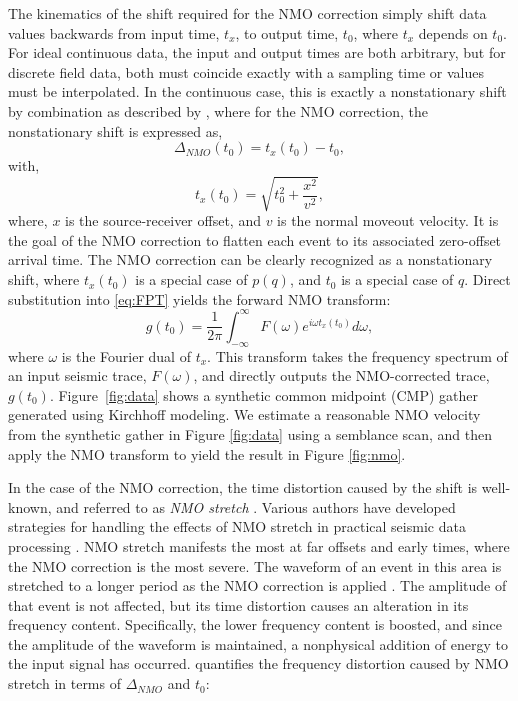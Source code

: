 The kinematics of the shift required for the NMO correction simply shift data values backwards from input time, $t_{x}$, to output time, $t_{0}$, where $t_{x}$ depends on $t_{0}$.  For ideal continuous data, the input and output times are both arbitrary, but for discrete field data, both must coincide exactly with a sampling time or values must be interpolated.  
In the continuous case, this is exactly a nonstationary shift by combination as described by \cite{margrave98}, where for the NMO correction, the nonstationary shift is expressed as,
\begin{equation}
\label{eq:DeltaNMO}
	\Delta_{NMO} \left( t_0 \right) = t_x \left( t_0 \right) - t_0,
\end{equation}
\citep{burnett_ferguson08a} with,
\begin{equation}
\label{eq:NMO}
	t_x(t_0)=\sqrt{t_0^2+\frac{x^2}{v^2}},
\end{equation}
where, $x$ is the source-receiver offset, and $v$ is the normal moveout velocity.  
It is the goal of the NMO correction to flatten each event to its associated zero-offset arrival time. The NMO correction can be clearly recognized as a nonstationary shift, where $t_x(t_0)$ is a special case of $p(q)$, and $t_0$ is a special case of $q$.  Direct substitution into \ref{eq:FPT} yields the forward NMO transform:
\begin{equation}
  g\left(t_0\right) =\frac{1}{2\pi }\int _{-\infty }^{\infty }F(\omega )e^{i \omega t_x(t_0)} d\omega ,
\label{eq:NMOT}
\end{equation}
where $\omega $ is the Fourier dual of $t_x$.  This transform takes the frequency spectrum of an input seismic trace, $F(\omega )$, and directly outputs the NMO-corrected trace, $g(t_0)$.  
Figure~\ref{fig:data} shows a synthetic common midpoint (CMP) gather generated using Kirchhoff modeling.
We estimate a reasonable NMO velocity from the synthetic gather in Figure \ref{fig:data} using a semblance scan, and then apply the NMO transform to yield the result in Figure \ref{fig:nmo}.

In the case of the NMO correction, the time distortion caused by the shift is well-known, and referred to as \textit{NMO stretch} \citep{buchholtz72,dunkin_levin73}. 
Various authors have developed strategies for handling the effects of NMO stretch in practical seismic data processing \citep{miller92,perroud_tygel04,shatilo_aminzadeh00}. 
NMO stretch manifests the most at far offsets and early times, where the NMO correction is the most severe.  
The waveform of an event in this area is stretched to a longer period as the NMO correction is applied \cite[]{yilmaz01}.  
The amplitude of that event is not affected, but its time distortion causes an alteration in its frequency content.  
Specifically, the lower frequency content is boosted, and since the amplitude of the waveform is maintained, a nonphysical addition of energy to the input signal has occurred.   
\cite{yilmaz01} quantifies the frequency distortion caused by NMO stretch in terms of $\Delta _{NMO}$ and $t_0$:

